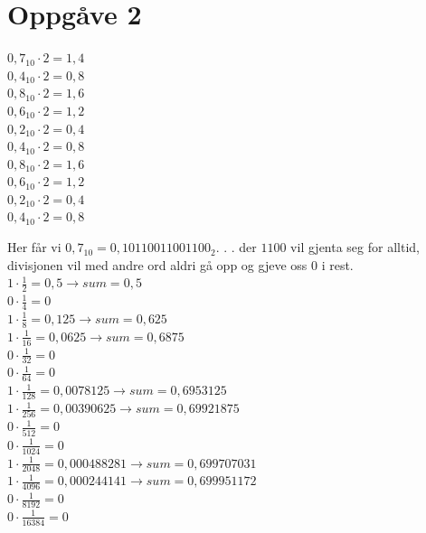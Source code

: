 \documentclass[12pt,a4paper]{article}
\begin{document}
  \section{Oppgåve 2}
    \begin{centering}
    $0,7_{10} \cdot 2 = 1,4$ \\
    $0,4_{10} \cdot 2 = 0,8$ \\
    $0,8_{10} \cdot 2 = 1,6$ \\
    $0,6_{10} \cdot 2 = 1,2$ \\
    $0,2_{10} \cdot 2 = 0,4$ \\
    $0,4_{10} \cdot 2 = 0,8$ \\
    $0,8_{10} \cdot 2 = 1,6$ \\
    $0,6_{10} \cdot 2 = 1,2$ \\
    $0,2_{10} \cdot 2 = 0,4$ \\
    $0,4_{10} \cdot 2 = 0,8$ \\
    \end{centering}

    Her får vi $0,7_{10}=0,10110011001100_{2}$. . . der $1100$ vil gjenta
    seg for alltid, divisjonen vil med andre ord aldri gå opp og gjeve
    oss 0 i rest. \\

    $1 \cdot \frac{1}{2} = 0,5 \rightarrow sum = 0,5$ \\
    $0 \cdot \frac{1}{4} = 0$ \\
    $1 \cdot \frac{1}{8} = 0,125 \rightarrow sum = 0,625$ \\
    $1 \cdot \frac{1}{16} = 0,0625 \rightarrow sum = 0,6875$ \\
    $0 \cdot \frac{1}{32} = 0$ \\
    $0 \cdot \frac{1}{64} = 0$ \\
    $1 \cdot \frac{1}{128} = 0,0078125 \rightarrow sum = 0,6953125$ \\
    $1 \cdot \frac{1}{256} = 0,00390625 \rightarrow sum = 0,69921875$ \\
    $0 \cdot \frac{1}{512} = 0$ \\
    $0 \cdot \frac{1}{1024} = 0$ \\
    $1 \cdot \frac{1}{2048} = 0,000488281 \rightarrow sum = 0,699707031$ \\
    $1 \cdot \frac{1}{4096} = 0,000244141 \rightarrow sum = 0,699951172$ \\
    $0 \cdot \frac{1}{8192} = 0$ \\
    $0 \cdot \frac{1}{16384} = 0$ \\
\end{document}

